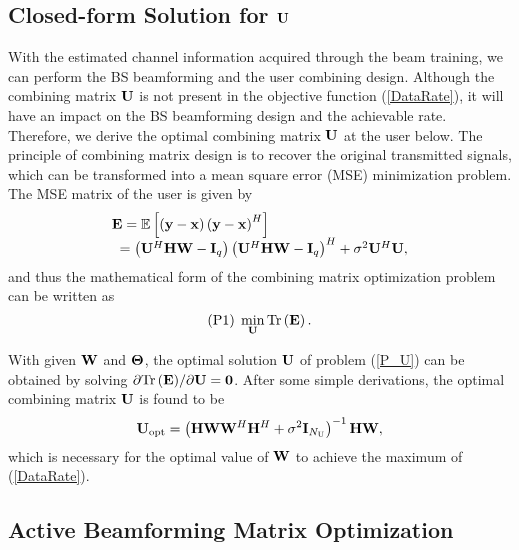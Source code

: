\documentclass[lettersize, journal]{IEEEtran}
\begin{document}
\subsection{Closed-form Solution for $\bf{U}$}

With the estimated channel information acquired through the beam training, we can perform the BS beamforming and the user combining design.
Although the combining matrix $\bf{U}$ is not present in the objective function (\ref{DataRate}), it will have an impact on the BS beamforming design and the achievable rate.
Therefore, we derive the optimal combining matrix $\bf{U}$ at the user below.
The principle of combining matrix design is to recover the original transmitted signals, which can be transformed into a mean square error (MSE) minimization problem.
The MSE matrix of the user is given by
\begin{equation}\label{MSE}
\begin{array}{l}
{\bf{E}} = {\mathbb{E}}\left[  \left( {\bf{y}} - {\bf{x}} \right)  \left({\bf{y}} - {\bf{x}} \right)^H\right] \\
\;\; = \left( {\bf{U}}^H {\bf{H}} {\bf{W}} - {\bf{I}}_{q} \right) \left( {\bf{U}}^H {\bf{H}} {\bf{W}} - {\bf{I}}_{q} \right) ^H + \sigma^{2}{\bf{U}}^H{\bf{U}},
\end{array}
\end{equation}
and thus the mathematical form of the combining matrix optimization problem can be written as
\begin{equation}\label{P_U}
({\rm{P1}}) \; \min\limits_{\bf{U}} {\rm{Tr}}\left( {\bf{E}} \right).
\end{equation}

With given $\bf{W}$ and ${\bf{\Theta }}$, the optimal solution ${\bf{U}}$ of problem (\ref{P_U}) can be obtained by solving ${\partial {\rm{Tr}}\left( {\bf{E}} \right)}/{\partial {\bf{U}}} = {\bf{0}}$.
After some simple derivations, the optimal combining matrix ${\bf{U}}$ is found to be
\begin{equation}\label{Opt_U}
{\bf{U}}_{\rm{opt}} = \left( {\bf{H}} {\bf{W}} {\bf{W}}^H {\bf{H}}^H + \sigma^2{\bf{I}}_{N_{\rm{U}}}\right)^{-1}{\bf{H}} {\bf{W}},
\end{equation}
which is necessary for the optimal value of ${\bf{W}}$ to achieve the maximum of (\ref{DataRate}).



\subsection{Active Beamforming Matrix Optimization }
\end{document}
